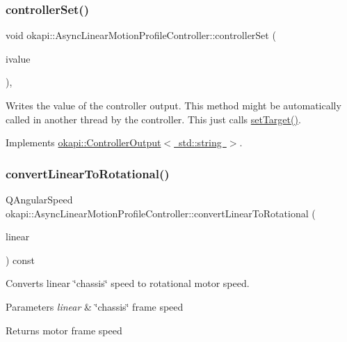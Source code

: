 \subsubsection{\texorpdfstring{controllerSet()}{controllerSet()}}
{\footnotesize\ttfamily void okapi\+::\+Async\+Linear\+Motion\+Profile\+Controller\+::controller\+Set (\begin{DoxyParamCaption}\item[{std\+::string}]{ivalue }\end{DoxyParamCaption})\hspace{0.3cm}{\ttfamily [override]}, {\ttfamily [virtual]}}

Writes the value of the controller output. This method might be automatically called in another thread by the controller. This just calls \mbox{\hyperlink{classokapi_1_1AsyncLinearMotionProfileController_a18e3ba77f08cb5dd93a9cba23d4c2a1e}{set\+Target()}}. 

Implements \mbox{\hyperlink{classokapi_1_1ControllerOutput_a360c08f0c10b36f882d6d3100c2cad49}{okapi\+::\+Controller\+Output$<$ std\+::string $>$}}.

\mbox{\label{classokapi_1_1AsyncLinearMotionProfileController_a3b2473f949bab83f6837b8d448b198cb}} 
\subsubsection{\texorpdfstring{convertLinearToRotational()}{convertLinearToRotational()}}
{\footnotesize\ttfamily Q\+Angular\+Speed okapi\+::\+Async\+Linear\+Motion\+Profile\+Controller\+::convert\+Linear\+To\+Rotational (\begin{DoxyParamCaption}\item[{Q\+Speed}]{linear }\end{DoxyParamCaption}) const\hspace{0.3cm}{\ttfamily [protected]}}

Converts linear \char`\"{}chassis\char`\"{} speed to rotational motor speed.


\begin{DoxyParams}{Parameters}
{\em linear} & \char`\"{}chassis\char`\"{} frame speed \\
\hline
\end{DoxyParams}
\begin{DoxyReturn}{Returns}
motor frame speed 
\end{DoxyReturn}
\mbox{\label{classokapi_1_1AsyncLinearMotionProfileController_ac9f7d18503d72627ff4b7f70d2c373bd}} 
